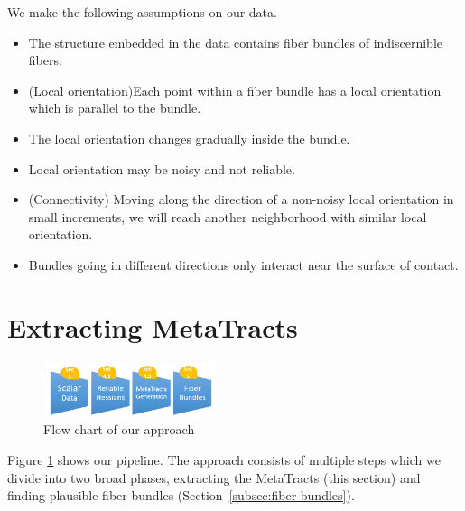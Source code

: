 We make the following assumptions on our data.
\begin{itemize}
\item The structure embedded in the data contains fiber bundles  of indiscernible fibers.
\item (Local orientation)Each point within a fiber  bundle has a local orientation which is parallel to the bundle.
\item The local orientation changes gradually inside the bundle.
\item Local orientation may be noisy and not reliable.
\item (Connectivity) Moving along the direction of a non-noisy local orientation in small increments, we will reach another neighborhood with similar local orientation.
\item Bundles going in different directions only interact near the surface of contact.
\end{itemize}



\section {Extracting MetaTracts }
\label{sec:approach}

\begin{figure}
\centering
\includegraphics[width=0.45\textwidth]{imagesMT2014/algo_A.png}
\caption{Flow chart of our approach}
\label{fig:flowchart}
\end{figure}
 Figure \ref{fig:flowchart} shows our pipeline. The approach consists of multiple steps which we divide into two broad phases, extracting the MetaTracts  (this section) and  finding plausible fiber bundles (Section~\ref{subsec:fiber-bundles}).
